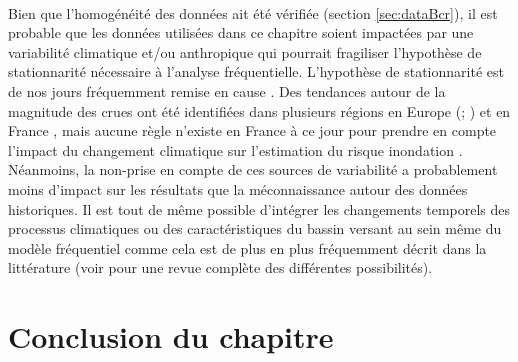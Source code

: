 \documentclass[11pt]{article}
\begin{document}
	\paragraph{} Bien que l'homogénéité des données ait été vérifiée (section \ref{sec:dataBcr}), il est probable que les données utilisées dans ce chapitre soient impactées par une variabilité climatique et/ou anthropique qui pourrait fragiliser l'hypothèse de stationnarité nécessaire à l'analyse fréquentielle. L'hypothèse de stationnarité est de nos jours fréquemment remise en cause \citep{milly_stationarity_2008}. Des tendances autour de la magnitude des crues ont été identifiées dans plusieurs régions en Europe (\cite{hall_understanding_2014}; \cite{bloschl_changing_2019}) et en France \cite{giuntoli_floods_2019}, mais aucune règle n'existe en France à ce jour pour prendre en compte l'impact du changement climatique sur l'estimation du risque inondation \cite{madsen_review_2014}. Néanmoins, la non-prise en compte de ces sources de variabilité a probablement moins d'impact sur les résultats que la méconnaissance autour des données historiques. Il est tout de même possible d'intégrer les changements temporels des processus climatiques ou des caractéristiques du bassin versant au sein même du modèle fréquentiel comme cela est de plus en plus fréquemment décrit dans la littérature (voir \cite{salas_techniques_2018} pour une revue complète des différentes possibilités). 

	
\section{Conclusion du chapitre}
\label{sec:Conclu}
\end{document}
